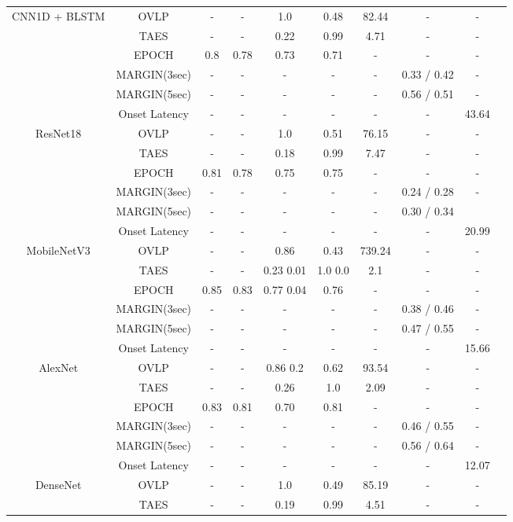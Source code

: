 \documentclass[pmlr,twocolumn,10pt]{jmlr}
\begin{document}
\begin{table*}[ht!]
\begin{tabular}{c|c|cccccccc}
		\midrule
		\multirow{6}{*}{CNN1D + BLSTM} 
		& OVLP & - & - & 1.0 & 0.48 & 82.44 & - & - \\
		& TAES & - & - & 0.22 & 0.99 & 4.71 & - & - \\
		& EPOCH & 0.8 & 0.78 & 0.73 & 0.71 & - & - & -  \\
		& MARGIN(3sec)  & - & - & - & - & - & 0.33 / 0.42 & -  \\
		& MARGIN(5sec) & - & - & - & - & - & 0.56 / 0.51 & - \\
		& Onset Latency & - & - & - & - & - & - & 43.64 \\
		\midrule
		\multirow{6}{*}{ResNet18} 
		& OVLP & - & - & 1.0 & 0.51 & 76.15 & - & - \\
		& TAES & - & - & 0.18 & 0.99 & 7.47 & - & - \\
		& EPOCH & 0.81 & 0.78 & 0.75 & 0.75 & - & - & -  \\
		& MARGIN(3sec)  & - & - & - & - & - & 0.24 / 0.28 & -  \\
		& MARGIN(5sec) & - & - & - & - & - & 0.30 / 0.34 & \\
		& Onset Latency & - & - & - & - & - & - & 20.99 \\
		\midrule
		\multirow{6}{*}{MobileNetV3} 
		& OVLP & - & - & 0.86 & 0.43 & 739.24 & - & - \\
		& TAES & - & - & 0.23 0.01 & 1.0 0.0 & 2.1 & - & - \\
		& EPOCH & 0.85 & 0.83 & 0.77 0.04 & 0.76 & - & - & -  \\
		& MARGIN(3sec)  & - & - & - & - & - & 0.38 / 0.46 & - \\
		& MARGIN(5sec) & - & - & - & - & - & 0.47 / 0.55 & - \\
		& Onset Latency & - & - & - & - & - & - & 15.66 \\
		\midrule
		\multirow{6}{*}{AlexNet} 
		& OVLP & - & - & 0.86 0.2 & 0.62 & 93.54 & - & - \\
		& TAES & - & - & 0.26 & 1.0 & 2.09 & - & - \\
		& EPOCH & 0.83 & 0.81 & 0.70 & 0.81 & - & - & -  \\
		& MARGIN(3sec)  & - & - & - & - & - & 0.46 / 0.55 & - \\
		& MARGIN(5sec) & - & - & - & - & - & 0.56 / 0.64 & - \\
		& Onset Latency & - & - & - & - & - & - & 12.07 \\
		\midrule
		\multirow{6}{*}{DenseNet} 
		& OVLP & - & - & 1.0 & 0.49 & 85.19  & - & - \\
		& TAES & - & - & 0.19 & 0.99 & 4.51 & - & - \\

\end{tabular}
\end{table*}
\end{document}
